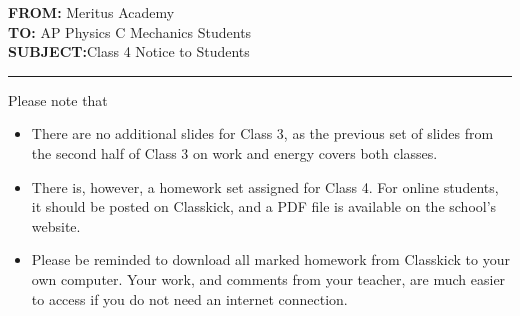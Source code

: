 \documentclass[letterpaper,11pt]{article}
\begin{document}
\textbf{FROM:}\tabto{1.3in} Meritus Academy\\
\textbf{TO:}\tabto{1.3in} AP Physics C Mechanics Students\\
\textbf{SUBJECT:}\tabto{1.3in}Class 4 Notice to Students

\vspace{.2in}\hrule

Please note that

\begin{itemize}[itemsep=4pt,topsep=0pt,leftmargin=15pt]
\item There are no additional slides for Class 3, as the previous set of
  slides from the second half of Class 3 on work and energy covers both classes.

\item There is, however, a homework set assigned for Class 4. For online
  students, it should be posted on Classkick, and a PDF file is available on
  the school's website.

\item Please be reminded to download all marked homework from Classkick to your
  own computer. Your work, and comments from your teacher, are much easier to
  access if you do not need an internet connection.
\end{itemize}
\end{document}
